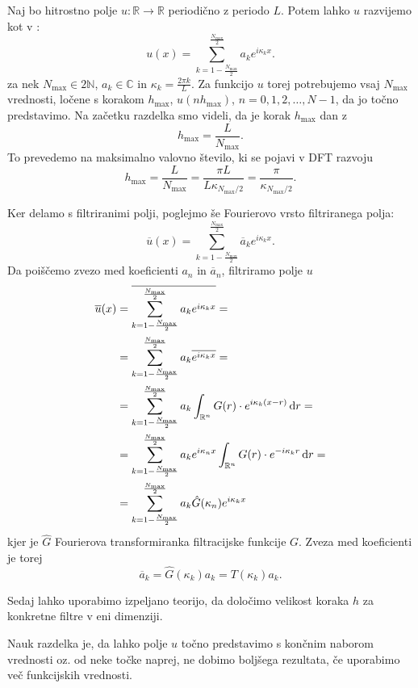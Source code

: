 \documentclass[mat2, tisk]{fmfdelo}
\newcommand{\R}{\mathbb R}
\newcommand{\N}{\mathbb N}
\newcommand{\C}{\mathbb C}
\begin{document}
\noindent
Naj bo hitrostno polje $u: \R \rightarrow \R$ periodično z periodo $L$.
Potem lahko $u$ razvijemo kot v :
$$
u(x) = \sum_{k=1-\frac{N_{\text{max}}}{2}}^{\frac{N_\text{max}}{2}} a_k e^{i\kappa_k x}.
$$
za nek $N_\text{max} \in 2\N$, $a_k \in \C$ in $\kappa_k = \frac{2\pi k}{L}$. 
Za funkcijo $u$ torej potrebujemo vsaj $N_{\text{max}}$ vrednosti, ločene s korakom $h_{\text{max}}$,
$u(n h_{\text{max}})$, $n = 0, 1, 2, \dots, N - 1$, da jo točno predstavimo.
Na začetku razdelka smo videli, da je korak $h_\text{max}$ dan z 
$$
h_\text{max} = \frac{L}{N_\text{max}}.
$$
To prevedemo na maksimalno valovno število, ki se pojavi v 
DFT razvoju 
$$
h_\text{max} = \frac{L}{N_\text{max}} = \frac{\pi L}{L \kappa_{{N_\text{max}/2}}} = \frac{\pi}{\kappa_{N_\text{max}/2}}.
$$

Ker delamo s filtriranimi polji, poglejmo še Fourierovo vrsto filtriranega polja:
\begin{equation}
\label{eq:filterDFT}
\overline{u}(x) = \sum_{k=1-\frac{N_{\text{max}}}{2}}^{\frac{N_\text{max}}{2}} \overline{a}_k e^{i\kappa_k x}.
\end{equation}
Da poiščemo zvezo med koeficienti $a_n$ in $\overline{a}_n$, filtriramo polje $u$
\begin{align*}
\overline{u}(x) &= \overline{\sum_{k=1-\frac{N_{\text{max}}}{2}}^{\frac{N_\text{max}}{2}} a_k e^{i\kappa_k x}} = \\
&= \sum_{k=1-\frac{N_{\text{max}}}{2}}^{\frac{N_\text{max}}{2}} a_k \overline{e^{i\kappa_k x}} = \\ 
&= \sum_{k=1-\frac{N_{\text{max}}}{2}}^{\frac{N_\text{max}}{2}} a_k \int_{\R^n} G(r)\cdot e^{i\kappa_k(x - r)} \dif r = \\
&= \sum_{k=1-\frac{N_{\text{max}}}{2}}^{\frac{N_\text{max}}{2}} a_k e^{i\kappa_n x }\int_{\R^n} G(r)\cdot e^{-i\kappa_k r} \dif r =\\
&= \sum_{k=1-\frac{N_{\text{max}}}{2}}^{\frac{N_\text{max}}{2}} a_k \hat{G}(\kappa_n) e^{i\kappa_k x}
\end{align*}
kjer je $\hat{G}$ Fourierova transformiranka filtracijske funkcije $G$. Zveza med koeficienti je torej 
\begin{equation}
  \label{koef_filter}
\overline{a}_k = \hat{G}(\kappa_k) a_k = T(\kappa_k) a_k.
\end{equation}

Sedaj lahko uporabimo izpeljano teorijo, da določimo velikost koraka $h$ 
za konkretne filtre v eni dimenziji. 

\begin{opomba}
Nauk razdelka je, da lahko polje $u$ točno predstavimo s končnim naborom 
vrednosti oz. od neke točke naprej, ne dobimo boljšega rezultata, če 
uporabimo več funkcijskih vrednosti.
\end{opomba}
\end{document}
